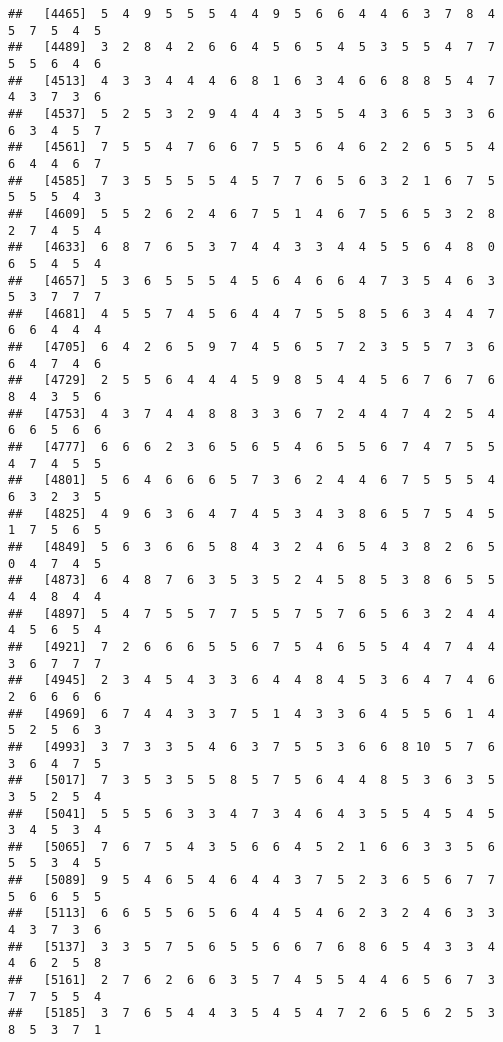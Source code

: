 \documentclass[
]{book}
\begin{document}
\begin{verbatim}
##   [4465]  5  4  9  5  5  5  4  4  9  5  6  6  4  4  6  3  7  8  4  5  7  5  4  5
##   [4489]  3  2  8  4  2  6  6  4  5  6  5  4  5  3  5  5  4  7  7  5  5  6  4  6
##   [4513]  4  3  3  4  4  4  6  8  1  6  3  4  6  6  8  8  5  4  7  4  3  7  3  6
##   [4537]  5  2  5  3  2  9  4  4  4  3  5  5  4  3  6  5  3  3  6  6  3  4  5  7
##   [4561]  7  5  5  4  7  6  6  7  5  5  6  4  6  2  2  6  5  5  4  6  4  4  6  7
##   [4585]  7  3  5  5  5  5  4  5  7  7  6  5  6  3  2  1  6  7  5  5  5  5  4  3
##   [4609]  5  5  2  6  2  4  6  7  5  1  4  6  7  5  6  5  3  2  8  2  7  4  5  4
##   [4633]  6  8  7  6  5  3  7  4  4  3  3  4  4  5  5  6  4  8  0  6  5  4  5  4
##   [4657]  5  3  6  5  5  5  4  5  6  4  6  6  4  7  3  5  4  6  3  5  3  7  7  7
##   [4681]  4  5  5  7  4  5  6  4  4  7  5  5  8  5  6  3  4  4  7  6  6  4  4  4
##   [4705]  6  4  2  6  5  9  7  4  5  6  5  7  2  3  5  5  7  3  6  6  4  7  4  6
##   [4729]  2  5  5  6  4  4  4  5  9  8  5  4  4  5  6  7  6  7  6  8  4  3  5  6
##   [4753]  4  3  7  4  4  8  8  3  3  6  7  2  4  4  7  4  2  5  4  6  6  5  6  6
##   [4777]  6  6  6  2  3  6  5  6  5  4  6  5  5  6  7  4  7  5  5  4  7  4  5  5
##   [4801]  5  6  4  6  6  6  5  7  3  6  2  4  4  6  7  5  5  5  4  6  3  2  3  5
##   [4825]  4  9  6  3  6  4  7  4  5  3  4  3  8  6  5  7  5  4  5  1  7  5  6  5
##   [4849]  5  6  3  6  6  5  8  4  3  2  4  6  5  4  3  8  2  6  5  0  4  7  4  5
##   [4873]  6  4  8  7  6  3  5  3  5  2  4  5  8  5  3  8  6  5  5  4  4  8  4  4
##   [4897]  5  4  7  5  5  7  7  5  5  7  5  7  6  5  6  3  2  4  4  4  5  6  5  4
##   [4921]  7  2  6  6  6  5  5  6  7  5  4  6  5  5  4  4  7  4  4  3  6  7  7  7
##   [4945]  2  3  4  5  4  3  3  6  4  4  8  4  5  3  6  4  7  4  6  2  6  6  6  6
##   [4969]  6  7  4  4  3  3  7  5  1  4  3  3  6  4  5  5  6  1  4  5  2  5  6  3
##   [4993]  3  7  3  3  5  4  6  3  7  5  5  3  6  6  8 10  5  7  6  3  6  4  7  5
##   [5017]  7  3  5  3  5  5  8  5  7  5  6  4  4  8  5  3  6  3  5  3  5  2  5  4
##   [5041]  5  5  5  6  3  3  4  7  3  4  6  4  3  5  5  4  5  4  5  3  4  5  3  4
##   [5065]  7  6  7  5  4  3  5  6  6  4  5  2  1  6  6  3  3  5  6  5  5  3  4  5
##   [5089]  9  5  4  6  5  4  6  4  4  3  7  5  2  3  6  5  6  7  7  5  6  6  5  5
##   [5113]  6  6  5  5  6  5  6  4  4  5  4  6  2  3  2  4  6  3  3  4  3  7  3  6
##   [5137]  3  3  5  7  5  6  5  5  6  6  7  6  8  6  5  4  3  3  4  4  6  2  5  8
##   [5161]  2  7  6  2  6  6  3  5  7  4  5  5  4  4  6  5  6  7  3  7  7  5  5  4
##   [5185]  3  7  6  5  4  4  3  5  4  5  4  7  2  6  5  6  2  5  3  8  5  3  7  1

\end{verbatim}
\end{document}
